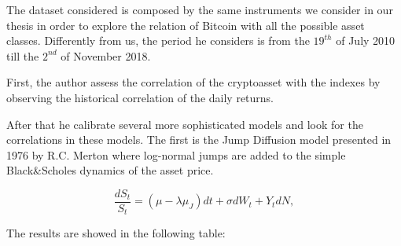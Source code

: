 The dataset considered is composed by the same instruments we consider in our thesis in order to explore the relation of Bitcoin with all the possible asset classes. Differently from us, the period he considers is from the $19^{th}$ of July 2010 till the $2^{nd}$ of November 2018.

First, the author assess the correlation of the cryptoasset with the indexes by observing the historical correlation of the daily returns.

\begin{table}[H]
    \caption{Historical Correlations between bitcoin and other instruments, source: \citep{samuele}}
\end{table}
\bigskip
After that he calibrate several more sophisticated models and look for the correlations in these models.
The first is the Jump Diffusion model presented in 1976 by R.C. Merton where log-normal jumps are added to the simple Black\&Scholes dynamics of the asset price.

\begin{equation}
  \frac{dS_t}{S_t} = \left(\mu - \lambda\mu_J \right) dt + \sigma dW_t + Y_t dN ,  
\end{equation}

The results are showed in the following table:

